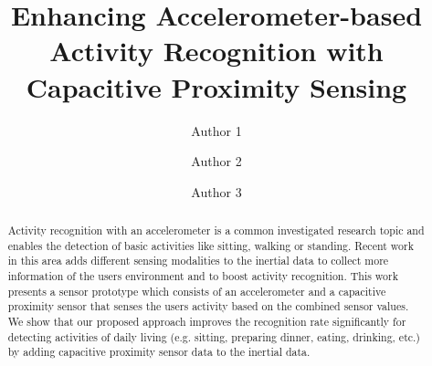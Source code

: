 \documentclass[runningheads,a4paper]{llncs}
\begin{document}
\mainmatter  %

\title{Enhancing Accelerometer-based Activity Recognition with Capacitive Proximity Sensing}


\author{Author 1 \and Author 2 \and Author 3 }





\maketitle
\begin{abstract}
Activity recognition with an accelerometer is a common investigated research topic and enables the detection of basic activities like sitting, walking or standing. Recent work in this area adds different sensing modalities to the inertial data to collect more information of the users environment and to boost activity recognition. This work presents a sensor prototype which consists of an accelerometer and a capacitive proximity sensor that senses the users activity based on the combined sensor values. We show that our proposed approach improves the recognition rate significantly for detecting activities of daily living (e.g. sitting, preparing dinner, eating, drinking, etc.) by adding capacitive proximity sensor data to the inertial data.
\end{abstract}
\end{document}
